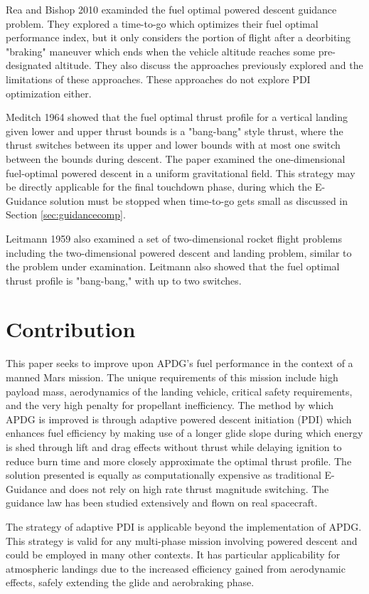 Rea and Bishop 2010\:\cite{REA} examinded the fuel optimal powered descent guidance problem. They explored a time-to-go which optimizes their fuel optimal performance index, but it only considers the portion of flight after a deorbiting "braking" maneuver which ends when the vehicle altitude reaches some pre-designated altitude. They also discuss the approaches previously explored and the limitations of these approaches. These approaches do not explore PDI optimization either.

Meditch 1964\:\cite{MEDITCH} showed that the fuel optimal thrust profile for a vertical landing given lower and upper thrust bounds is a "bang-bang" style thrust, where the thrust switches between its upper and lower bounds with at most one switch between the bounds during descent. The paper examined the one-dimensional fuel-optimal powered descent in a uniform gravitational field. This strategy may be directly applicable for the final touchdown phase, during which the E-Guidance solution must be stopped when time-to-go gets small as discussed in Section \ref{sec:guidancecomp}.

Leitmann 1959\:\cite{LEITMANN} also examined a set of two-dimensional rocket flight problems including the two-dimensional powered descent and landing problem, similar to the problem under examination. Leitmann also showed that the fuel optimal thrust profile is "bang-bang," with up to two switches.


\section{Contribution}
This paper seeks to improve upon APDG's fuel performance in the context of a manned Mars mission. The unique requirements of this mission include high payload mass, aerodynamics of the landing vehicle, critical safety requirements, and the very high penalty for propellant inefficiency. The method by which APDG is improved is through adaptive powered descent initiation (PDI) which enhances fuel efficiency by making use of a longer glide slope during which energy is shed through lift and drag effects without thrust while delaying ignition to reduce burn time and more closely approximate the optimal thrust profile. The solution presented is equally as computationally expensive as traditional E-Guidance and does not rely on high rate thrust magnitude switching. The guidance law has been studied extensively and flown on real spacecraft.

The strategy of adaptive PDI is applicable beyond the implementation of APDG. This strategy is valid for any multi-phase mission involving powered descent and could be employed in many other contexts. It has particular applicability for atmospheric landings due to the increased efficiency gained from aerodynamic effects, safely extending the glide and aerobraking phase.

